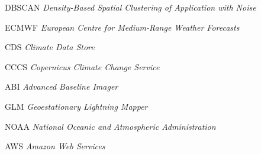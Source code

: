 \begin{siglas}
  \item[DBSCAN] \textit{Density-Based Spatial Clustering of Application with Noise}
  \item[ECMWF] \textit{European Centre for Medium-Range Weather Forecasts}
  \item[CDS] \textit{Climate Data Store}
  \item[CCCS] \textit{Copernicus Climate Change Service}
  \item[ABI] \textit{Advanced Baseline Imager}
  \item[GLM] \textit{Geoestationary Lightning Mapper}
  \item[NOAA] \textit{National Oceanic and Atmospheric Administration}
  \item[AWS] \textit{Amazon Web Services}
\end{siglas}
